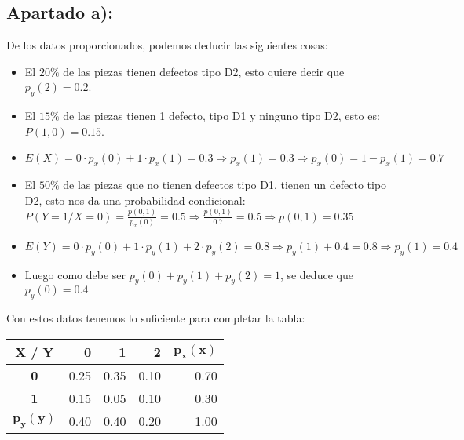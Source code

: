 \documentclass[11pt]{article}
\begin{document}
\subsection*{Apartado a):}

De los datos proporcionados, podemos deducir las siguientes cosas: 

\begin{itemize}

\item El $20\%$ de las piezas tienen defectos tipo D2, esto quiere decir que
      $p_y(2) = 0.2$. 

\item El $15\%$ de las piezas tienen 1 defecto, tipo D1 y ninguno tipo D2, esto es:
      $P(1, 0) = 0.15$. 

\item $ E(X) = 0 \cdot p_x(0) + 1 \cdot p_x(1) = 0.3 \Rightarrow p_x(1) = 0.3 \Rightarrow p_x(0) = 1 - p_x(1) = 0.7$ 

\item El $50\%$ de las piezas que no tienen defectos tipo D1, tienen un defecto
      tipo D2, esto nos da una probabilidad condicional: 
      $P(Y = 1 / X = 0) = \frac{p(0, 1)}{p_x(0)} = 0.5 \Rightarrow \frac{p(0, 1)}{0.7} = 0.5 \Rightarrow p(0, 1)= 0.35 $ 

\item $ E(Y) = 0 \cdot p_y(0) + 1 \cdot p_y(1) + 2 \cdot p_y(2) = 0.8 \Rightarrow p_y(1) + 0.4 = 0.8 \Rightarrow p_y(1) = 0.4 $  

\item Luego como debe ser $p_y(0) + p_y(1) + p_y(2) = 1$, se deduce que $p_y(0) = 0.4$ 

\end{itemize}

Con estos datos tenemos lo suficiente para completar la tabla:

\begin{center}
    \begin{tabular}{| c | r | r | r | r |}
    \hline
    \textbf{X / Y} & \textbf{0} & \textbf{1} & \textbf{2} & $\mathbf{p_x(x)}$ \\ \hline
    \textbf{0} & 0.25 & 0.35 & 0.10 & 0.70 \\ \hline
    \textbf{1} & 0.15 & 0.05 & 0.10 & 0.30 \\ \hline
    $\mathbf{p_y(y)}$ & 0.40 & 0.40 & 0.20 & 1.00 \\ \hline
    \end{tabular}
\end{center}
\end{document}
